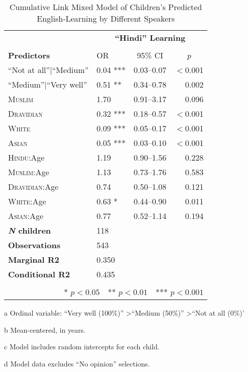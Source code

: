 \begin{table*}[t]
\small
\caption{Cumulative Link Mixed Model of Children's Predicted English-Learning by Different Speakers}\label{tab:wealth-ord}
    \centering
    \vspace{5pt}
\begin{threeparttable}
\begin{tabular}{llcr}
 \toprule
& \multicolumn{3}{c}{\textbf{``Hindi'' Learning}\tnote{a}} \\
\cline{2-4} \\[-.75em]
\textbf{Predictors} & {OR} & {95\% CI} & \multicolumn{1}{c}{\textit{p}} \\ 
\midrule
  \hline
``Not at all''$|$``Medium'' & 0.04 *** & 0.03--0.07 & $<$0.001 \\ 
  ``Medium''$|$``Very well'' & 0.51 ** & 0.34--0.78 & 0.002 \\ 
  \textsc{Muslim} & 1.70 & 0.91--3.17 & 0.096 \\ 
  \textsc{Dravidian} & 0.32 *** & 0.18--0.57 & $<$0.001 \\ 
  \textsc{White} & 0.09 *** & 0.05--0.17 & $<$0.001 \\ 
  \textsc{Asian} & 0.05 *** & 0.03--0.10 & $<$0.001 \\ 
\textsc{Hindu}:Age\tnote{b} & 1.19 & 0.90--1.56 & 0.228 \\ 
  \textsc{Muslim}:Age & 1.13 & 0.73--1.76 & 0.583 \\ 
  \textsc{Dravidian}:Age & 0.74 & 0.50--1.08 & 0.121 \\ 
  \textsc{White}:Age & 0.63 * & 0.44--0.90 & 0.011 \\ 
  \textsc{Asian}:Age & 0.77 & 0.52--1.14 & 0.194 \\ 
\midrule
\bfseries{\textit{N} children}\tnote{c} & 118 &  &  \\ 
\textbf{Observations}\tnote{d} & 543 &  &  \\ 
 \textbf{Marginal R2} & 0.350 &  &  \\ 
 \textbf{Conditional R2}& 0.435 &  &  \\ 
 \bottomrule\\[-.75em]
\multicolumn{4}{r}{* $p<0.05$~~** $p<0.01$~~*** $p<0.001$}\\
\end{tabular}
\begin{tablenotes}[flushleft]
    \item[a] Ordinal variable: ``Very well (100\%)'' \textgreater ``Medium (50\%)'' \textgreater ``Not at all (0\%)'
    \item[b] Mean-centered, in years.
    \item[c] Model includes random intercepts for each child.
    \item[d] Model data excludes ``No opinion'' selections. 
\end{tablenotes}
\end{threeparttable}
\end{table*}
